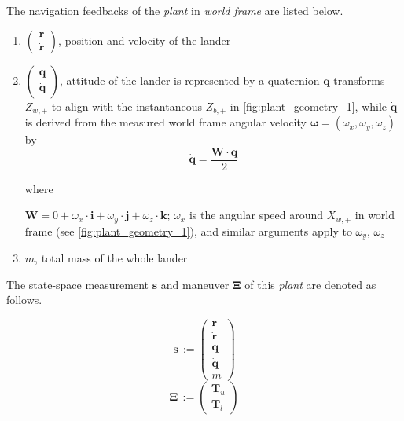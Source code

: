 \documentclass[10pt]{elsarticle}
\begin{document}
The navigation feedbacks of the \textit{plant} in \textit{world frame} are listed below.
\begin{enumerate}[label=\textbf{a.\arabic*}, itemsep=2pt] %
  \item \label{eqs:r} $\begin{pmatrix} \boldsymbol{r} \\ \dot{\boldsymbol{r}} \end{pmatrix}$, position and velocity of the lander 
  \item \label{eqs:quat} $\begin{pmatrix} \boldsymbol{q} \\ \dot{\boldsymbol{q}} \end{pmatrix}$, attitude of the lander is represented by a quaternion $\boldsymbol{q}$ transforms $Z_{w,+}$ to align with the instantaneous $Z_{b,+}$ in \cref{fig:plant_geometry_1}, while $\dot{\boldsymbol{q}}$ is derived from the measured world frame angular velocity $\boldsymbol{\omega} = (\omega_x, \omega_y, \omega_z)$ by       
\[
    \boldsymbol{\dot{q}} = \frac{\boldsymbol{W} \cdot \boldsymbol{q}}{2}
\]

where 

$\boldsymbol{W} = 0 + \omega_x \cdot \boldsymbol{i} + \omega_y \cdot \boldsymbol{j} + \omega_z \cdot \boldsymbol{k}$; $\omega_x$ is the angular speed around $X_{w,+}$ in world frame (see \cref{fig:plant_geometry_1}), and similar arguments apply to $\omega_y$, $\omega_z$

  \item \label{eqs:m} $m$, total mass of the whole lander
\end{enumerate}

The state-space measurement $\boldsymbol{s}$ and maneuver $\boldsymbol{\Xi}$ of this \textit{plant} are denoted as follows.

\begin{equation} \label{eqs:state}
    \boldsymbol{s} \, := \begin{pmatrix} \boldsymbol{r} \\ \dot{\boldsymbol{r}} \\ \boldsymbol{q} \\ \boldsymbol{\dot{q}} \\ m \end{pmatrix}  
\end{equation}
\begin{equation} \label{eqs:maneuver}
    \boldsymbol{\Xi} \, := \begin{pmatrix} \boldsymbol{T}_{u} \\ \boldsymbol{T}_{l} \end{pmatrix}  
\end{equation}
\end{document}
